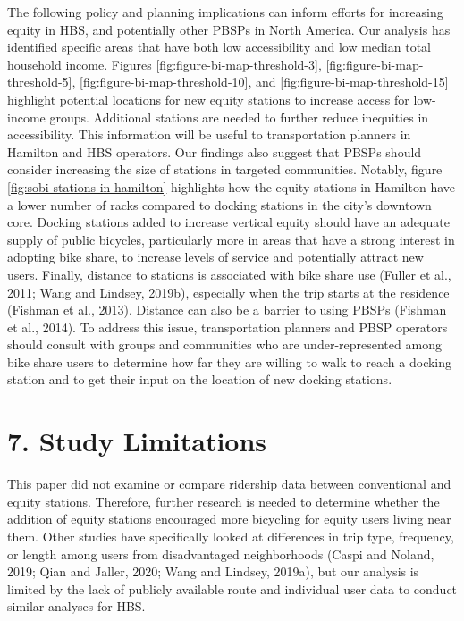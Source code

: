 \documentclass[]{elsarticle} %
\begin{document}
The following policy and planning implications can inform efforts for
increasing equity in HBS, and potentially other PBSPs in North America.
Our analysis has identified specific areas that have both low
accessibility and low median total household income. Figures
\ref{fig:figure-bi-map-threshold-3},
\ref{fig:figure-bi-map-threshold-5},
\ref{fig:figure-bi-map-threshold-10}, and
\ref{fig:figure-bi-map-threshold-15} highlight potential locations for
new equity stations to increase access for low-income groups. Additional
stations are needed to further reduce inequities in accessibility. This
information will be useful to transportation planners in Hamilton and
HBS operators. Our findings also suggest that PBSPs should consider
increasing the size of stations in targeted communities. Notably, figure
\ref{fig:sobi-stations-in-hamilton} highlights how the equity stations
in Hamilton have a lower number of racks compared to docking stations in
the city's downtown core. Docking stations added to increase vertical
equity should have an adequate supply of public bicycles, particularly
more in areas that have a strong interest in adopting bike share, to
increase levels of service and potentially attract new users. Finally,
distance to stations is associated with bike share use (Fuller et al.,
2011; Wang and Lindsey, 2019b), especially when the trip starts at the
residence (Fishman et al., 2013). Distance can also be a barrier to
using PBSPs (Fishman et al., 2014). To address this issue,
transportation planners and PBSP operators should consult with groups
and communities who are under-represented among bike share users to
determine how far they are willing to walk to reach a docking station
and to get their input on the location of new docking stations.

\hypertarget{study-limitations}{%
\section{7. Study Limitations}\label{study-limitations}}

This paper did not examine or compare ridership data between
conventional and equity stations. Therefore, further research is needed
to determine whether the addition of equity stations encouraged more
bicycling for equity users living near them. Other studies have
specifically looked at differences in trip type, frequency, or length
among users from disadvantaged neighborhoods (Caspi and Noland, 2019;
Qian and Jaller, 2020; Wang and Lindsey, 2019a), but our analysis is
limited by the lack of publicly available route and individual user data
to conduct similar analyses for HBS.
\end{document}
